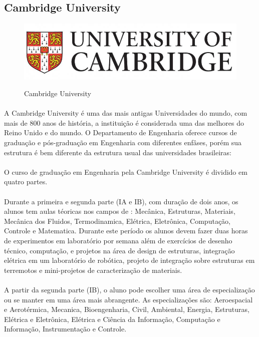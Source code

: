 \documentclass[12pt]{article} %
\begin{document}
\subsection{Cambridge University}

\begin{figure}[H]
\centering
\includegraphics[scale=0.3]{pictures/logoCambridge.jpg}\\
\caption{Cambridge University}
\end{figure}

\paragraph{} A Cambridge University é uma das mais antigas Universidades do mundo, com mais de 800 anos de história, a instituição é considerada uma das melhores do Reino Unido e do mundo. O Departamento de Engenharia oferece cursos de graduação e pós-graduação em Engenharia com diferentes enfâses, porém sua estrutura é bem diferente da estrutura usual das universidades brasileiras:

\paragraph{} O curso de graduação em Engenharia pela Cambridge University é dividido em quatro partes.

\paragraph{} Durante a primeira e segunda parte (IA e IB), com duração de dois anos, os alunos tem aulas téoricas nos campos de : Mecânica, Estruturas, Materiais, Mecânica dos Fluidos, Termodinamica, Elétrica, Eletrônica, Computação, Controle e Matematica. Durante este período os alunos devem fazer duas horas de experimentos em laboratório por semana além de exercícios de desenho técnico, computação, e projetos na área de design de estruturas, integração elétrica em um laboratório de robótica, projeto de integração sobre estruturas em terremotos e mini-projetos de caracterização de materiais.

\paragraph{} A partir da segunda parte (IB), o aluno pode escolher uma área de especialização ou se manter em uma área mais abrangente. As especializações são: Aeroespacial e Aerotérmica, Mecanica, Bioengenharia, Civil, Ambiental, Energia, Estruturas, Elétrica e Eletrônica, Elétrica e Ciência da Informação, Computação e Informação, Instrumentação e Controle.
\end{document}
